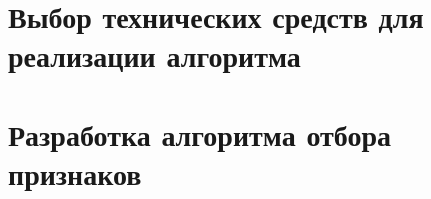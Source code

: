 \section[Выбор технических средств для реализации алгоритма]{Выбор технических средств для реализации алгоритма}



\section[Разработка алгоритма отбора признаков]{Разработка алгоритма отбора признаков}


